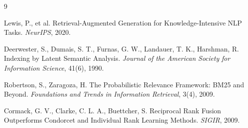 \documentclass[11pt]{article}
\begin{document}
\begin{thebibliography}{9}

Lewis, P., et al. Retrieval-Augmented Generation for Knowledge-Intensive NLP
Tasks. \textit{NeurIPS}, 2020.

Deerwester, S., Dumais, S. T., Furnas, G. W., Landauer, T. K., Harshman, R.
Indexing by Latent Semantic Analysis. \textit{Journal of the American
Society for Information Science}, 41(6), 1990.

Robertson, S., Zaragoza, H. The Probabilistic Relevance Framework: BM25 and
Beyond. \textit{Foundations and Trends in Information Retrieval}, 3(4), 2009.

Cormack, G. V., Clarke, C. L. A., Buettcher, S. Reciprocal Rank Fusion
Outperforms Condorcet and Individual Rank Learning Methods. \textit{SIGIR},
2009.

\end{thebibliography}
\end{document}
